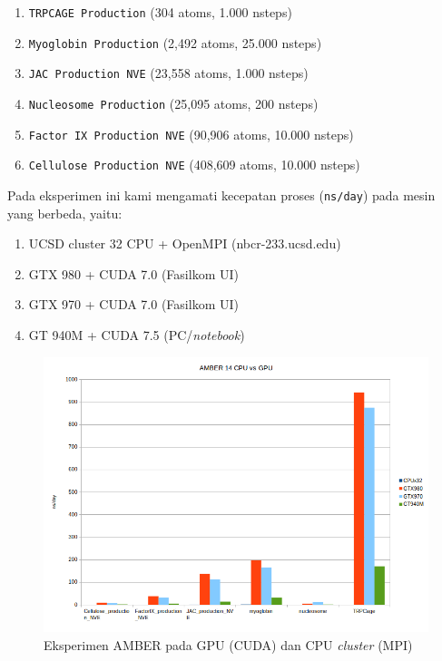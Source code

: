 \begin{enumerate}
	\item \verb|TRPCAGE Production| (304 atoms, 1.000 nsteps)
	\item \verb|Myoglobin Production| (2,492 atoms, 25.000 nsteps)
	\item \verb|JAC Production NVE| (23,558 atoms, 1.000 nsteps)
	\item \verb|Nucleosome Production| (25,095 atoms, 200 nsteps)
	\item \verb|Factor IX Production NVE| (90,906 atoms, 10.000 nsteps)
	\item \verb|Cellulose Production NVE| (408,609 atoms, 10.000 nsteps)	
\end{enumerate}

Pada eksperimen ini kami mengamati kecepatan proses (\verb|ns/day|) pada mesin yang berbeda, yaitu:

\begin{enumerate}
	\item UCSD cluster 32 CPU + OpenMPI (nbcr-233.ucsd.edu)
	\item GTX 980 + CUDA 7.0 (Fasilkom UI)
	\item GTX 970 + CUDA 7.0 (Fasilkom UI)
	\item GT 940M + CUDA 7.5 (PC/\textit{notebook})
\end{enumerate}

\begin{figure}
	\centering
	\includegraphics[width=1\textwidth]
	{pics/amber_mpi_cuda}
	\caption{Eksperimen AMBER pada GPU (CUDA) dan CPU \textit{cluster} (MPI)}
	\label{fig:amber_mpi_cuda}
\end{figure}  

